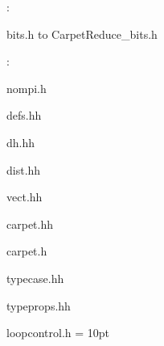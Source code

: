 \vspace{5mm}

: 



bits.h to CarpetReduce\_bits.h
\vspace{2mm}

: 

nompi.h

defs.hh

dh.hh

dist.hh

vect.hh

carpet.hh

carpet.h

typecase.hh

typeprops.hh

loopcontrol.h
\vspace{2mm}\parskip = 10pt 
